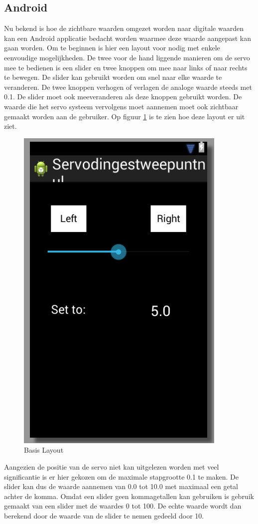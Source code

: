 \documentclass[a4paper]{article}
\begin{document}
		\subsection{Android}
		Nu bekend is hoe de zichtbare waarden omgezet worden naar digitale waarden kan een Android applicatie bedacht worden waarmee deze waarde aangepast kan gaan worden. Om te beginnen is hier een layout voor nodig met enkele eenvoudige mogelijkheden. De twee voor de hand liggende manieren om de servo mee te bedienen is een slider en twee knoppen om mee naar links of naar rechts te bewegen. De slider kan gebruikt worden om snel naar elke waarde te veranderen. De twee knoppen verhogen of verlagen de analoge waarde steeds met 0.1. De slider moet ook meeveranderen als deze knoppen gebruikt worden. De waarde die het servo systeem vervolgens moet aannemen moet ook zichtbaar gemaakt worden aan de gebruiker. Op figuur \ref{fig:layout1} is te zien hoe deze layout er uit ziet.
	\begin{figure}[h]
		\centering
		\includegraphics[scale=0.6]{imgs/layout1.png}
		\caption{Basis Layout}
		\label{fig:layout1}
	\end{figure}
	Aangezien de positie van de servo niet kan uitgelezen worden met veel significantie is er hier gekozen om de maximale stapgrootte 0.1 te maken. De slider kan dus de waarde aannemen van 0.0 tot 10.0 met maximaal een getal achter de komma. Omdat een slider geen kommagetallen kan gebruiken is gebruik gemaakt van een slider met de waardes 0 tot 100. De echte waarde wordt dan berekend door de waarde van de slider te nemen gedeeld door 10.
\end{document}
